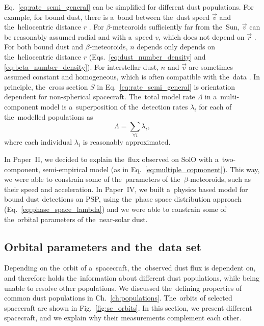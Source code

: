 Eq.~\ref{eq:rate_semi_general} can be simplified for different dust populations. For example, for bound dust, there is a~bond between the~dust speed $\vec{v}$ and the~heliocentric distance $r$ \citep{szalay2020near}. For $\beta$-meteoroids sufficiently far from the~Sun, $\vec{v}$ can be reasonably assumed radial and with a~speed $v$, which does not depend on $\vec{r}$ \citep{zaslavsky2021first}. For both bound dust and $\beta$-meteoroids, $n$ depends only depends on the~heliocentric distance $r$ (Eqs.~\ref{eq:dust_number_density} and \ref{eq:beta_number_density}). For interstellar dust, $n$ and $\vec{v}$ are sometimes assumed constant and homogeneous, which is often compatible with the~data \citep{babic2022situ}. In principle, the~cross section $S$ in Eq.~\ref{eq:rate_semi_general} is orientation dependent for non-spherical spacecraft. 
The~total model rate $\Lambda$ in a~multi-component model is a~superposition of the~detection rates $\lambda_i$ for each of the~modelled populations as
\begin{equation}
    \Lambda = \sum_{\forall i} \lambda_i, \label{eq:multiple_copmonent}
\end{equation}
where each individual $\lambda_i$ is reasonably approximated. 

In Paper~II, we decided to explain the~flux observed on SolO with a~two-component, semi-empirical model (as in Eq.~\ref{eq:multiple_copmonent}). This way, we were able to constrain some of the~parameters of the~$\beta$-meteoroids, such as their speed and acceleration. In Paper~IV, we built a~physics based model for bound dust detections on PSP, using the~phase space distribution approach (Eq.~\ref{eq:phase_space_lambda}) and we were able to constrain some of the~orbital parameters of the~near-solar dust. 

\subsection{Orbital parameters and the~data set}

Depending on the~orbit of a~spacecraft, the~observed dust flux is dependent on, and therefore holds the~information about different dust populations, while being unable to resolve other populations. We discussed the~defining properties of common dust populations in Ch.~\ref{ch:populations}. The~orbits of selected spacecraft are shown in Fig.~\ref{fig:sc_orbits}. In this section, we present different spacecraft, and we explain why their measurements complement each other.  

